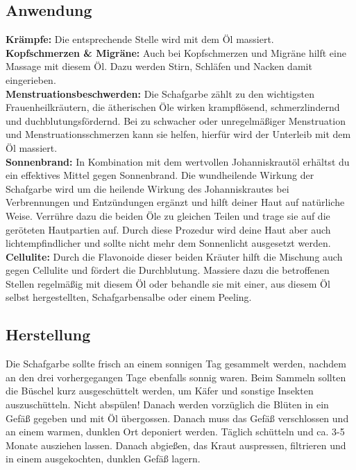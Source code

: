 \subsection{Anwendung}

\textbf{Krämpfe:} Die entsprechende Stelle wird mit dem Öl massiert.\\ 

\textbf{Kopfschmerzen \& Migräne:} Auch bei Kopfschmerzen und Migräne hilft eine Massage mit diesem Öl. Dazu werden Stirn, Schläfen und Nacken damit eingerieben. \\

\textbf{Menstruationsbeschwerden:} Die Schafgarbe zählt zu den wichtigsten Frauenheilkräutern, die ätherischen Öle wirken krampflösend, schmerzlindernd und duchblutungsfördernd. Bei zu schwacher oder unregelmäßiger Menstruation und Menstruationsschmerzen kann sie helfen, hierfür wird der Unterleib mit dem Öl massiert.\\

\textbf{Sonnenbrand:} In Kombination mit dem wertvollen Johanniskrautöl erhältst du ein effektives Mittel gegen Sonnenbrand. Die wundheilende Wirkung der Schafgarbe wird um die heilende Wirkung des Johanniskrautes bei Verbrennungen und Entzündungen ergänzt und hilft deiner Haut auf natürliche Weise. Verrühre dazu die beiden Öle zu gleichen Teilen und trage sie auf die geröteten Hautpartien auf. Durch diese Prozedur wird deine Haut aber auch lichtempfindlicher und sollte nicht mehr dem Sonnenlicht ausgesetzt werden.\\ 

\textbf{Cellulite:} Durch die Flavonoide dieser beiden Kräuter hilft die Mischung auch gegen Cellulite und fördert die Durchblutung. Massiere dazu die betroffenen Stellen regelmäßig mit diesem Öl oder behandle sie mit einer, aus diesem Öl selbst hergestellten, Schafgarbensalbe oder einem Peeling. \\


\subsection{Herstellung}

Die Schafgarbe sollte frisch an einem sonnigen Tag gesammelt werden, nachdem an den drei vorhergegangen Tage ebenfalls sonnig waren. Beim Sammeln sollten die Büschel kurz ausgeschüttelt werden, um Käfer und sonstige Insekten auszuschütteln. Nicht abspülen! Danach werden vorzüglich die Blüten in ein Gefäß gegeben und mit Öl übergossen. Danach muss das Gefäß verschlossen und an einem warmen, dunklen Ort deponiert werden. Täglich schütteln und ca. 3-5 Monate ausziehen lassen. Danach abgießen, das Kraut auspressen, filtrieren und in einem ausgekochten, dunklen Gefäß lagern. 

